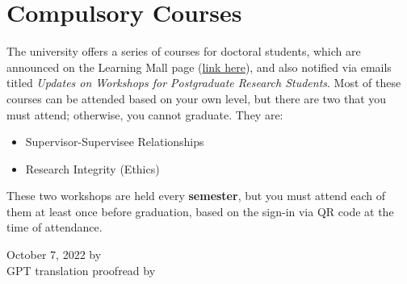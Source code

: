 \section{Compulsory Courses}
The university offers a series of courses for doctoral students, which are announced on the Learning Mall page (\href{https://core.xjtlu.edu.cn/course/view.php?id=847}{link here}), and also notified via emails titled \textit{Updates on Workshops for Postgraduate Research Students}. Most of these courses can be attended based on your own level, but there are two that you must attend; otherwise, you cannot graduate. They are:

\begin{itemize}
    \item Supervisor-Supervisee Relationships
    \item Research Integrity (Ethics)
\end{itemize}

These two workshops are held every \textbf{semester}, but you must attend each of them at least once before graduation, based on the sign-in via QR code at the time of attendance.

\begin{flushright}
October 7, 2022 by \Wu \\
GPT translation proofread by \Shiyao
\end{flushright}
